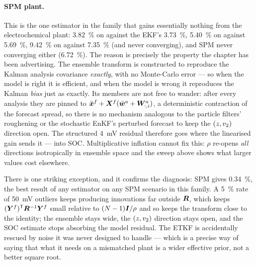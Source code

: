 \paragraph{SPM plant.}  This is the one estimator in the family that gains essentially nothing from
the electrochemical plant: \SI{3.82}{\percent} on  against the EKF's
\SI{3.73}{\percent}, \SI{5.40}{\percent} on  against \SI{5.69}{\percent},
\SI{9.42}{\percent} on  against \SI{7.35}{\percent} (and never converging), and SPM
 never converging either (\SI{6.72}{\percent}).  The reason is precisely the
property the chapter has been advertising.  The ensemble transform is constructed to reproduce the
Kalman analysis covariance \emph{exactly}, with no Monte-Carlo error --- so when the model is right
it is efficient, and when the model is wrong it reproduces the Kalman \emph{bias} just as exactly.
Its members are not free to wander: after every analysis they are pinned to $\bar{\bm{x}}^f + \bm{X}^f
(\bar{\bm w}^a + \bm{W}^a_{:,i})$, a deterministic contraction of the forecast spread, so there is no
mechanism analogous to the particle filters' roughening or the stochastic EnKF's perturbed forecast
to keep the $(z,v_2)$ direction open.  The structured \SI{4}{\milli\volt} residual therefore goes
where the linearised gain sends it --- into SOC.  Multiplicative inflation cannot fix this: $\rho$
re-opens \emph{all} directions isotropically in ensemble space and the sweep above shows what larger
values cost elsewhere.

There is one striking exception, and it confirms the diagnosis: SPM  gives
\SI{0.34}{\percent}, the best result of any estimator on any SPM scenario in this family.  A
\SI{5}{\percent} rate of \SI{50}{\milli\volt} outliers keeps producing innovations far outside
$\bm{R}$, which keeps $(\bm{Y}^f)^{\mathsf{T}}\bm{R}^{-1}\bm{Y}^f$ small relative to $(N-1)\bm{I}/\rho$ and so keeps the
transform close to the identity; the ensemble stays wide, the $(z,v_2)$ direction stays open, and
the SOC estimate stops absorbing the model residual.  The ETKF is accidentally rescued by noise it
was never designed to handle --- which is a precise way of saying that what it needs on a
mismatched plant is a wider effective prior, not a better square root.

